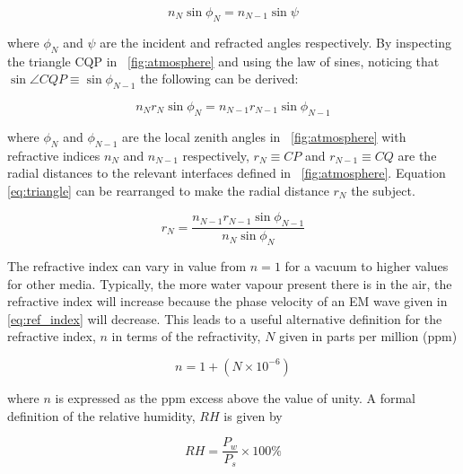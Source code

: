 \documentclass[11pt]{article}
\newcommand{\figref}[2][\figurename~]{#1\ref{#2}}
\begin{document}
\begin{equation}
\label{eq:Snell_law2}
n_N\sin{\phi_N} = n_{N-1}\sin{\psi}
\end{equation}

\vspace{2mm}
\noindent
where $\phi_N$ and $\psi$ are the incident and refracted angles respectively. By inspecting the triangle CQP in \figref{fig:atmosphere} and using the law of sines, noticing that $\sin{\angle{CQP}} \equiv \sin{\phi_{N-1}}$ the following can be derived: 

\begin{equation}
\label{eq:triangle}
n_Nr_N\sin{\phi_N} = n_{N-1}r_{N-1}\sin{\phi_{N-1}}
\end{equation}


\vspace{2mm}
\noindent
where $\phi_N$ and $\phi_{N-1}$ are the local zenith angles in \figref{fig:atmosphere} with refractive indices $n_N$ and $n_{N-1}$ respectively, $r_N \equiv CP$ and $r_{N-1} \equiv CQ$ are the radial distances to the relevant interfaces defined in \figref{fig:atmosphere}. Equation \eqref{eq:triangle} can be rearranged to make the radial distance $r_N$ the subject.

\begin{equation}
\label{eq:Snell_law3}
r_N = \frac{n_{N-1}r_{N-1}\sin{\phi_{N-1}}}{n_N\sin{\phi_N}}
\end{equation}

\vspace{2mm}
\noindent
The refractive index can vary in value from $n = 1$ for a vacuum to higher values for other media. Typically, the more water vapour present there is in the air, the refractive index will increase because the phase velocity of an EM wave given in \eqref{eq:ref_index} will decrease. This leads to a useful alternative definition for the refractive index, $n$ in terms of the refractivity, $N$ given in parts per million (ppm)

\begin{equation}
n = 1  + (N \times 10^{-6})
\label{eq:refractivity}
\end{equation}

\vspace{2mm}
\noindent
where $n$ is expressed as the ppm excess above the value of unity. A formal definition of the relative humidity, $RH$ \cite{Book01} is given by

\begin{equation}
RH = \frac{P_w}{P_s} \times 100\%
\label{eq:humidity}
\end{equation}
\end{document}

